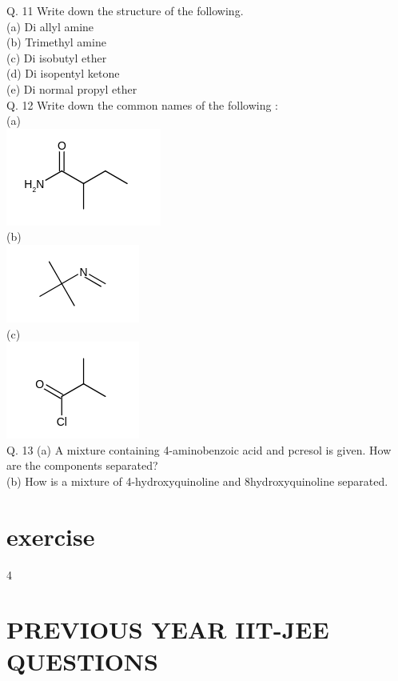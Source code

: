\documentclass[10pt]{article}
\begin{document}
Q. 11 Write down the structure of the following.\\
(a) Di allyl amine\\
(b) Trimethyl amine\\
(c) Di isobutyl ether\\
(d) Di isopentyl ketone\\
(e) Di normal propyl ether\\
Q. 12 Write down the common names of the following :\\
(a)\\
\includegraphics{smile-4143a858a060509aafd6fea970f33f6e57fa5f44}\\
(b)\\
\includegraphics{smile-a7ecc4b737b7947f1bc33eae7b41079e910dfe3e}\\
(c)\\
\includegraphics{smile-5cba0d772fc3158ffc68465b114cea4208824088}\\
Q. 13 (a) A mixture containing 4-aminobenzoic acid and pcresol is given. How are the components separated?\\
(b) How is a mixture of 4-hydroxyquinoline and 8hydroxyquinoline separated.

\section*{exercise}
4

\section*{PREVIOUS YEAR IIT-JEE QUESTIONS}
\end{document}
